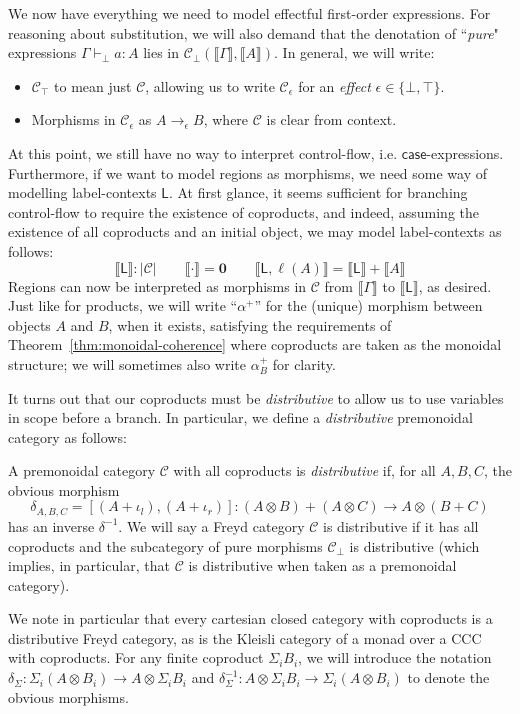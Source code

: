 \documentclass[acmsmall,screen,review]{acmart}
\newcommand{\mc}[1]{\ensuremath{\mathcal{#1}}}
\newcommand{\mb}[1]{\ensuremath{\mathbf{#1}}}
\newcommand{\ms}[1]{\ensuremath{\mathsf{#1}}}
\newcommand{\lhyp}[2]{#1(#2)}
\newcommand{\hasty}[4]{#1 \vdash_{#2} #3: {#4}}
\newcommand{\dnt}[1]{\llbracket{#1}\rrbracket}
\begin{document}
We now have everything we need to model effectful first-order expressions. For reasoning about
substitution, we will also demand that the denotation of ``\emph{pure}" expressions
$\hasty{\Gamma}{\bot}{a}{A}$ lies in $\mc{C}_\bot(\dnt{\Gamma}, \dnt{A})$. In general, we will
write:
\begin{itemize}
  \item $\mc{C}_\top$ to mean just $\mc{C}$, allowing us to write $\mc{C}_\epsilon$ for an
  \emph{effect} $\epsilon \in \{\bot, \top\}$.
  \item Morphisms in $\mc{C}_\epsilon$ as $A \to_\epsilon B$, where $\mc{C}$ is clear from context.
\end{itemize} 

At this point, we still have no way to interpret control-flow, i.e. $\ms{case}$-expressions.
Furthermore, if we want to model regions as morphisms, we need some way of modelling label-contexts
$\ms{L}$. At first glance, it seems sufficient for branching control-flow to require the existence
of coproducts, and indeed, assuming the existence of all coproducts and an initial object, we may
model label-contexts as follows:
$$
\boxed{\dnt{\ms{L}} : |\mc{C}|} \qquad 
  \dnt{\cdot} = \mb{0} \qquad \dnt{\ms{L}, \lhyp{\ell}{A}} = \dnt{\ms{L}} + \dnt{A}
$$
Regions can now be interpreted as morphisms in $\mc{C}$ from $\dnt{\Gamma}$ to $\dnt{\ms{L}}$, as
desired. Just like for products, we will write ``$\alpha^+$'' for the (unique) morphism between
objects $A$ and $B$, when it exists, satisfying the requirements of
Theorem~\ref{thm:monoidal-coherence} where coproducts are taken as the monoidal structure; we will
sometimes also write $\alpha^+_B$ for clarity.

It turns out that our coproducts must be \emph{distributive} to allow us to use variables in scope
before a branch. In particular, we define a \emph{distributive} premonoidal category as follows:
\begin{definition}
  A premonoidal category $\mc{C}$ with all coproducts is \emph{distributive} if, for all $A, B, C$,
  the obvious morphism
  $$
  \delta_{A, B, C} 
    = [(A + \iota_l), (A + \iota_r)] : (A \otimes B) + (A \otimes C) \to A \otimes (B + C)
  $$
  has an inverse $\delta^{-1}$. 
  We will say a Freyd category $\mc{C}$ is distributive if it has all coproducts and the subcategory
  of pure morphisms $\mc{C}_\bot$ is distributive (which implies, in particular, that $\mc{C}$ is
  distributive when taken as a premonoidal category).
\end{definition}
We note in particular that every cartesian closed category with coproducts is a distributive Freyd
category, as is the Kleisli category of a monad over a CCC with coproducts. 
%
For any finite coproduct $\Sigma_iB_i$, we will introduce the notation $\delta_{\Sigma} : \Sigma_i
(A \otimes B_i) \to A \otimes \Sigma_i B_i$ and $\delta_{\Sigma}^{-1} : A \otimes \Sigma_i B_i \to
\Sigma_i (A \otimes B_i)$ to denote the obvious morphisms.
%
\end{document}
